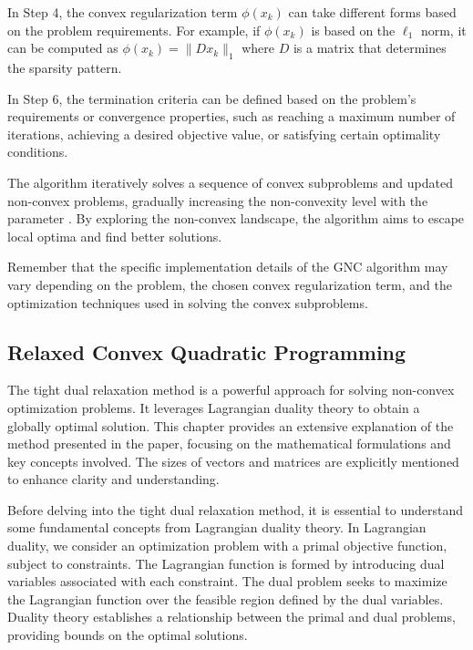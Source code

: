 In Step 4, the convex regularization term $\phi(x_k)$ can take different forms based on the problem requirements. For example, if $\phi(x_k)$ is based on the $\ell_1$ norm, it can be computed as $\phi(x_k) = \|Dx_k\|_1$ where $D$ is a matrix that determines the sparsity pattern.

In Step 6, the termination criteria can be defined based on the problem's requirements or convergence properties, such as reaching a maximum number of iterations, achieving a desired objective value, or satisfying certain optimality conditions.

The algorithm iteratively solves a sequence of convex subproblems and updated non-convex problems, gradually increasing the non-convexity level with the parameter . By exploring the non-convex landscape, the algorithm aims to escape local optima and find better solutions.

Remember that the specific implementation details of the GNC algorithm may vary depending on the problem, the chosen convex regularization term, and the optimization techniques used in solving the convex subproblems.

\subsection{Relaxed Convex Quadratic Programming} \label{subs:2-pose-estimation-relaxed-convex-quadratic-programming}


The tight dual relaxation method is a powerful approach for solving non-convex optimization problems. It leverages Lagrangian duality theory to obtain a globally optimal solution. This chapter provides an extensive explanation of the method presented in the paper, focusing on the mathematical formulations and key concepts involved. The sizes of vectors and matrices are explicitly mentioned to enhance clarity and understanding.

Before delving into the tight dual relaxation method, it is essential to understand some fundamental concepts from Lagrangian duality theory. In Lagrangian duality, we consider an optimization problem with a primal objective function, subject to constraints. The Lagrangian function is formed by introducing dual variables associated with each constraint. The dual problem seeks to maximize the Lagrangian function over the feasible region defined by the dual variables. Duality theory establishes a relationship between the primal and dual problems, providing bounds on the optimal solutions.

